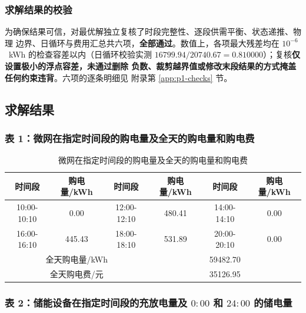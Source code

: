 \documentclass[withoutpreface,bwprint]{cumcmthesis}
\begin{document}
\subsubsection{求解结果的校验}

为确保结果可信，对最优解独立复核了时段完整性、逐段供需平衡、状态递推、物理
边界、日循环与费用汇总共六项，\textbf{全部通过}。数值上，各项最大残差均在
$10^{-6}$~kWh 的检查容差以内（日循环校验实测
$16799.94/20740.67=0.810000$）；复核\textbf{仅设置极小的浮点容差，未通过删除
负数、裁剪越界值或修改末段结果的方式掩盖任何约束违背}。六项的逐条明细见
附录第 \ref{app:p1-checks} 节。
\subsection{求解结果}

\subsubsection{表 1：微网在指定时间段的购电量及全天的购电量和购电费}

\begin{table}[htbp]
  \centering
  \caption{微网在指定时间段的购电量及全天的购电量和购电费}
  \label{tab:p1-buy}
  \begin{tabular}{cccccc}
    \toprule
    时间段 & 购电量/kWh & 时间段 & 购电量/kWh & 时间段 & 购电量/kWh \\
    \midrule
    10:00-10:10 & 0.00 & 12:00-12:10 & 480.41 & 14:00-14:10 & 0.00 \\
    16:00-16:10 & 445.43 & 18:00-18:10 & 531.89 & 20:00-20:10 & 0.00 \\
    \midrule
    \multicolumn{3}{c}{全天购电量/kWh} & \multicolumn{3}{c}{59482.70} \\
    \multicolumn{3}{c}{全天购电费/元}   & \multicolumn{3}{c}{35126.95} \\
    \bottomrule
  \end{tabular}
\end{table}

\subsubsection{表 2：储能设备在指定时间段的充放电量及 $0{:}00$ 和 $24{:}00$ 的储电量}
\end{document}
